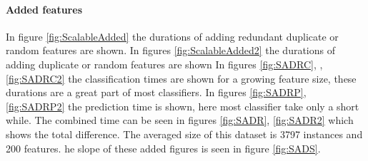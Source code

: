 \documentclass[a4paper,10pt]{article}
\begin{document}
\paragraph{Added features}
In figure \ref{fig:ScalableAdded} the durations of adding redundant duplicate or random features are shown. In figures \ref{fig:ScalableAdded2} the durations of adding duplicate or random features are shown In figures \ref{fig:SADRC}, ,\ref{fig:SADRC2} the classification times are shown for a growing feature size, these durations are a great part of most classifiers. In figures \ref{fig:SADRP}, \ref{fig:SADRP2} the prediction time is shown, here most classifier take only a short while. The combined time can be seen in figures \ref{fig:SADR}, \ref{fig:SADR2} which shows the total difference.
The averaged size of this dataset is 3797 instances and 200 features. he slope of these added figures is seen in figure \ref{fig:SADS}.
\end{document}
